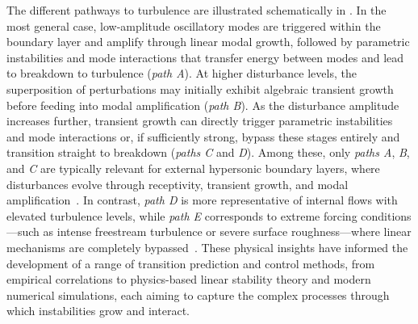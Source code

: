 The different pathways to turbulence are illustrated schematically in . In the most general case, low-amplitude oscillatory modes are triggered within the boundary layer and amplify through linear modal growth, followed by parametric instabilities and mode interactions that transfer energy between modes and lead to breakdown to turbulence (\textit{path A}). At higher disturbance levels, the superposition of perturbations may initially exhibit algebraic transient growth before feeding into modal amplification (\textit{path B}). As the disturbance amplitude increases further, transient growth can directly trigger parametric instabilities and mode interactions or, if sufficiently strong, bypass these stages entirely and transition straight to breakdown (\textit{paths C} and \textit{D}). Among these, only \textit{paths A}, \textit{B}, and \textit{C} are typically relevant for external hypersonic boundary layers, where disturbances evolve through receptivity, transient growth, and modal amplification~\citep{Lefieux2021}. In contrast, \textit{path D} is more representative of internal flows with elevated turbulence levels, while \textit{path E} corresponds to extreme forcing conditions—such as intense freestream turbulence or severe surface roughness—where linear mechanisms are completely bypassed~\citep{Reshotko2001}. These physical insights have informed the development of a range of transition prediction and control methods, from empirical correlations to physics-based linear stability theory and modern numerical simulations, each aiming to capture the complex processes through which instabilities grow and interact. 



